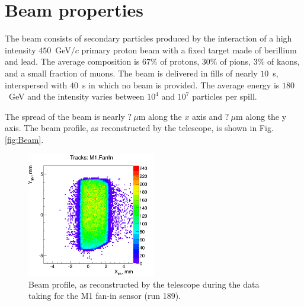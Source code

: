 \section{Beam properties}
\label{sec:BeamProperties}

The beam consists of secondary particles produced by the interaction of a high intensity $450$~GeV$/c$ primary proton beam with a fixed target made of berillium and lead.
The average composition is $67\%$ of protons, $30\%$ of pions, $3\%$ of kaons, and a small fraction of muons.
The beam is delivered in fills of nearly $10$~s, interspersed with $40$~s in which no beam is provided.
The average energy is $180$~GeV and the intensity varies between $10^4$ and $10^7$ particles per spill.

The spread of the beam is nearly $?~\mu$m along the $x$ axis and $?~\mu$m along the y axis. The beam profile, as reconstructed by the telescope, is shown in Fig. \ref{fig:Beam}.

\begin{figure}[]
\centering
\includegraphics[width=0.5\textwidth]{figs/Tracks_2D_M1_FanIn_189_15106.png} %
\caption[Beam profile, as reconstructed by the telescope.]{Beam profile, as reconstructed by the telescope during the data taking for the M1 fan-in sensor (run 189).}
\label{fig:BeamProfile}
\end{figure}